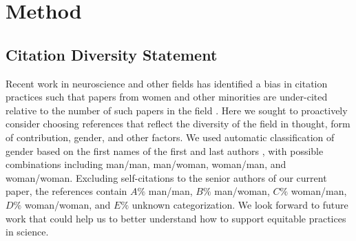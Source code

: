 \documentclass[12pt]{article}
\begin{document}
\section{Method}
\subsection{Citation Diversity Statement}

Recent work in neuroscience and other fields has identified a bias in citation practices such that papers from women and other minorities are under-cited relative to the number of such papers in the field \cite{Dworkin2020.01.03.894378, maliniak2013gender, caplar2017quantitative, chakravartty2018communicationsowhite, YannikThiemKrisF.SealeyAmyE.FerrerAdrielM.Trott2018, dion2018gendered}. Here we sought to proactively consider choosing references that reflect the diversity of the field in thought, form of contribution, gender, and other factors. We used automatic classification of gender based on the first names of the first and last authors \cite{Dworkin2020.01.03.894378, zhou_dale_2020_3672110}, with possible combinations including man/man, man/woman, woman/man, and woman/woman. Excluding self-citations to the senior authors of our current paper, the references contain $A\%$ man/man, $B\%$ man/woman, $C\%$ woman/man, $D\%$ woman/woman, and $E\%$ unknown categorization. We look forward to future work that could help us to better understand how to support equitable practices in science.

\newpage


\end{document}
